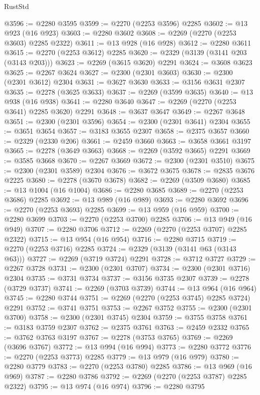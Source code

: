 \begin{lexlean}{RustStd}
\begin{coremodule}
@3596 := @2280 @3595
@3599 := @2270 (@2253 @3596) @2285
@3602 := @13 @923 (@16 @923)
@3603 := @2280 @3602
@3608 := @2269 (@2270 (@2253 @3603) @2285 @2322)
@3611 := @13 @928 (@16 @928)
@3612 := @2280 @3611
@3615 := @2270 (@2253 @3612) @2285
@3620 := @2329 (@3139 (@3141 @203 (@3143 @203)))
@3623 := @2269 (@3615 @3620) @2291
@3624 := @3608 @3623
@3625 := @2267 @3624
@3627 := @2300 (@2301 @3603)
@3630 := @2300 (@2301 @3612) @2304
@3631 := @3627 @3630
@3633 := @3156 @3631 @2307
@3635 := @2278 (@3625 @3633)
@3637 := @2269 (@3599 @3635)
@3640 := @13 @938 (@16 @938)
@3641 := @2280 @3640
@3647 := @2269 (@2270 (@2253 @3641) @2285 @3620) @2291
@3648 := @3637 @3647
@3649 := @2267 @3648
@3651 := @2300 (@2301 @3596)
@3654 := @2300 (@2301 @3641) @2304
@3655 := @3651 @3654
@3657 := @3183 @3655 @2307
@3658 := @2375 @3657
@3660 := @2329 (@2330 @206)
@3661 := @2459 @3660
@3663 := @3658 @3661 @3197
@3665 := @2278 (@3649 @3663)
@3668 := @2269 (@3592 @3665) @2291
@3669 := @3585 @3668
@3670 := @2267 @3669
@3672 := @2300 (@2301 @3510)
@3675 := @2300 (@2301 @3589) @2304
@3676 := @3672 @3675
@3678 := @2835 @3676 @2225
@3680 := @2278 (@3670 @3678)
@3682 := @2269 (@3509 @3680)
@3685 := @13 @1004 (@16 @1004)
@3686 := @2280 @3685
@3689 := @2270 (@2253 @3686) @2285
@3692 := @13 @989 (@16 @989)
@3693 := @2280 @3692
@3696 := @2270 (@2253 @3693) @2285
@3699 := @13 @959 (@16 @959)
@3700 := @2280 @3699
@3703 := @2270 (@2253 @3700) @2285
@3706 := @13 @949 (@16 @949)
@3707 := @2280 @3706
@3712 := @2269 (@2270 (@2253 @3707) @2285 @2322)
@3715 := @13 @954 (@16 @954)
@3716 := @2280 @3715
@3719 := @2270 (@2253 @3716) @2285
@3724 := @2329 (@3139 (@3141 @63 (@3143 @63)))
@3727 := @2269 (@3719 @3724) @2291
@3728 := @3712 @3727
@3729 := @2267 @3728
@3731 := @2300 (@2301 @3707)
@3734 := @2300 (@2301 @3716) @2304
@3735 := @3731 @3734
@3737 := @3156 @3735 @2307
@3739 := @2278 (@3729 @3737)
@3741 := @2269 (@3703 @3739)
@3744 := @13 @964 (@16 @964)
@3745 := @2280 @3744
@3751 := @2269 (@2270 (@2253 @3745) @2285 @3724) @2291
@3752 := @3741 @3751
@3753 := @2267 @3752
@3755 := @2300 (@2301 @3700)
@3758 := @2300 (@2301 @3745) @2304
@3759 := @3755 @3758
@3761 := @3183 @3759 @2307
@3762 := @2375 @3761
@3763 := @2459 @2332
@3765 := @3762 @3763 @3197
@3767 := @2278 (@3753 @3765)
@3769 := @2269 (@3696 @3767)
@3772 := @13 @994 (@16 @994)
@3773 := @2280 @3772
@3776 := @2270 (@2253 @3773) @2285
@3779 := @13 @979 (@16 @979)
@3780 := @2280 @3779
@3783 := @2270 (@2253 @3780) @2285
@3786 := @13 @969 (@16 @969)
@3787 := @2280 @3786
@3792 := @2269 (@2270 (@2253 @3787) @2285 @2322)
@3795 := @13 @974 (@16 @974)
@3796 := @2280 @3795

\end{coremodule}
\end{lexlean}
